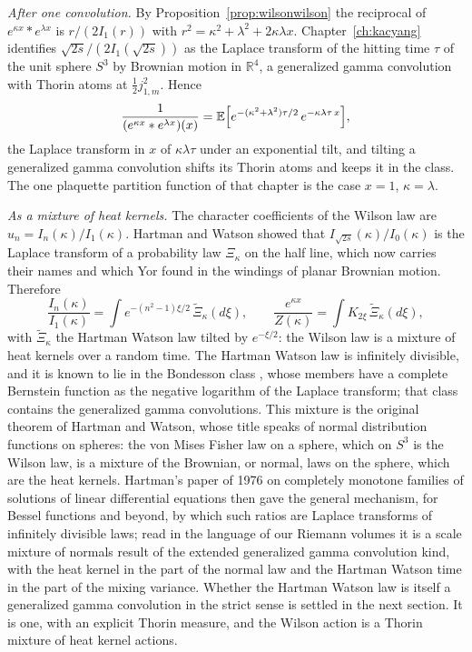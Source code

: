 \emph{After one convolution.} By Proposition~\ref{prop:wilsonwilson} the reciprocal of $e^{\kappa x}*e^{\lambda x}$ is $r/(2I_1(r))$ with $r^2=\kappa^2+\lambda^2+2\kappa\lambda x$. Chapter~\ref{ch:kacyang} identifies $\sqrt{2s}/(2I_1(\sqrt{2s}))$ as the Laplace transform of the hitting time $\tau$ of the unit sphere $S^3$ by Brownian motion in $\mathbb R^4$, a generalized gamma convolution with Thorin atoms at $\frac12j_{1,m}^2$. Hence
\[
\frac{1}{(e^{\kappa x}*e^{\lambda x})(x)}=\mathbb{E}\Big[e^{-(\kappa^2+\lambda^2)\tau/2}\,e^{-\kappa\lambda\tau\,x}\Big],
\]
the Laplace transform in $x$ of $\kappa\lambda\tau$ under an exponential tilt, and tilting a generalized gamma convolution shifts its Thorin atoms and keeps it in the class. The one plaquette partition function of that chapter is the case $x=1$, $\kappa=\lambda$.

\emph{As a mixture of heat kernels.} The character coefficients of the Wilson law are $u_n=I_n(\kappa)/I_1(\kappa)$. Hartman and Watson \cite{HW74} showed that $I_{\sqrt{2s}}(\kappa)/I_0(\kappa)$ is the Laplace transform of a probability law $\Xi_\kappa$ on the half line, which now carries their names and which Yor \cite{Yor80} found in the windings of planar Brownian motion. Therefore
\[
\frac{I_n(\kappa)}{I_1(\kappa)}=\int e^{-(n^2-1)\xi/2}\,\tilde\Xi_\kappa(d\xi),\qquad\frac{e^{\kappa x}}{Z(\kappa)}=\int K_{2\xi}\,\tilde\Xi_\kappa(d\xi),
\]
with $\tilde\Xi_\kappa$ the Hartman Watson law tilted by $e^{-\xi/2}$: the Wilson law is a mixture of heat kernels over a random time. The Hartman Watson law is infinitely divisible, and it is known to lie in the Bondesson class \cite{Ke78,Bo92}, whose members have a complete Bernstein function as the negative logarithm of the Laplace transform; that class contains the generalized gamma convolutions. This mixture is the original theorem of Hartman and Watson, whose title speaks of normal distribution functions on spheres: the von Mises Fisher law on a sphere, which on $S^3$ is the Wilson law, is a mixture of the Brownian, or normal, laws on the sphere, which are the heat kernels. Hartman's paper of 1976 \cite{Har76} on completely monotone families of solutions of linear differential equations then gave the general mechanism, for Bessel functions and beyond, by which such ratios are Laplace transforms of infinitely divisible laws; read in the language of our Riemann volumes it is a scale mixture of normals result of the extended generalized gamma convolution kind, with the heat kernel in the part of the normal law and the Hartman Watson time in the part of the mixing variance. Whether the Hartman Watson law is itself a generalized gamma convolution in the strict sense is settled in the next section. It is one, with an explicit Thorin measure, and the Wilson action is a Thorin mixture of heat kernel actions.

